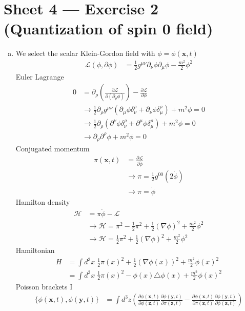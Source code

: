 \documentclass[10pt,a4paper]{report}
\theoremstyle{definition}
\begin{document}
\section{Sheet 4 — Exercise 2 (Quantization of spin 0 field)}
\begin{enumerate}[a)]
\item We select the scalar Klein-Gordon field with $\phi=\phi(\mathbf{x},t)$
\begin{align}
\mathcal{L}(\phi,\partial\phi)&=\frac{1}{2}g^{\mu\nu}\partial_\nu\phi\partial_\mu\phi-\frac{m^2}{2}\phi^2
\end{align}
Euler Lagrange
\begin{align}
0&=\partial_\rho\left(\frac{\partial\mathcal{L}}{\partial(\partial_\rho\phi)}\right)-\frac{\partial\mathcal{L}}{\partial\phi}\\
&\rightarrow \frac{1}{2}\partial_\rho g^{\mu\nu}(\partial_\mu\phi\delta^\rho_\nu+\partial_\nu\phi\delta^\rho_\mu)+m^2\phi=0\\
&\rightarrow \frac{1}{2}\partial_\rho(\partial^\nu\phi\delta^\rho_\nu+\partial^\mu\phi\delta^\rho_\mu)+m^2\phi=0\\
&\rightarrow \partial_\rho\partial^\rho\phi+m^2\phi=0
\end{align}
Conjugated momentum
\begin{align}
\pi(\mathbf{x},t)&=\frac{\partial\mathcal{L}}{\partial\dot{\phi}}\\
&\rightarrow \pi=\frac{1}{2}g^{00}(2\dot{\phi})\\
&\rightarrow \pi=\dot{\phi}
\end{align}
Hamilton density
\begin{align}
\mathcal{H}&=\pi\dot{\phi}-\mathcal{L}\\
&\rightarrow\mathcal{H}=\pi^2-\frac{1}{2}\pi^2+\frac{1}{2}(\nabla\phi)^2+\frac{m^2}{2}\phi^2\\
&\rightarrow\mathcal{H}=\frac{1}{2}\pi^2+\frac{1}{2}(\nabla\phi)^2+\frac{m^2}{2}\phi^2
\end{align}
Hamiltonian
\begin{align}
H
&=\int d^3x\;\frac{1}{2}\pi(x)^2+\frac{1}{2}(\nabla\phi(x))^2+\frac{m^2}{2}\phi(x)^2\\
&=\int d^3x\;\frac{1}{2}\pi(x)^2-\phi(x)\triangle\phi(x)+\frac{m^2}{2}\phi(x)^2
\end{align}
Poisson brackets I
\begin{align}
\{\phi(\mathbf{x},t),\phi(\mathbf{y},t)\}
&=\int d^3z\left(\frac{\partial\phi(\mathbf{x},t)}{\partial\phi(\mathbf{z},t)}\frac{\partial \phi(\mathbf{y},t)}{\partial\pi(\mathbf{z},t)}-\frac{\partial\phi(\mathbf{x},t)}{\partial\pi(\mathbf{z},t)}\frac{\partial \phi(\mathbf{y},t)}{\partial\phi(\mathbf{z},t)}\right)\\

\end{align}
\end{enumerate}
\end{document}
